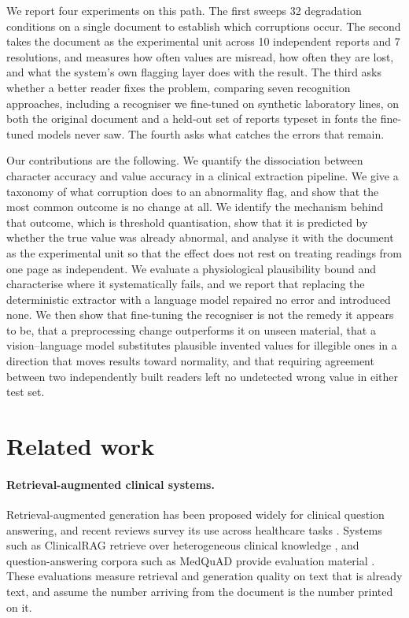 \documentclass[11pt]{article}
\begin{document}
We report four experiments on this path. The first sweeps 32 degradation conditions on a single
document to establish which corruptions occur. The second takes the document as the
experimental unit across 10 independent reports and 7 resolutions, and measures how often
values are misread, how often they are lost, and what the system's own flagging layer does with
the result. The third asks whether a better reader fixes the problem, comparing seven
recognition approaches, including a recogniser we fine-tuned on synthetic laboratory lines, on
both the original document and a held-out set of reports typeset in fonts the fine-tuned models
never saw. The fourth asks what catches the errors that remain.

Our contributions are the following. We quantify the dissociation between character accuracy
and value accuracy in a clinical extraction pipeline. We give a taxonomy of what corruption
does to an abnormality flag, and show that the most common outcome is no change at all. We
identify the mechanism behind that outcome, which is threshold quantisation, show that it is
predicted by whether the true value was already abnormal, and analyse it with the document as
the experimental unit so that the effect does not rest on treating readings from one page as
independent. We evaluate a physiological plausibility bound and characterise where it
systematically fails, and we report that replacing the deterministic extractor with a language
model repaired no error and introduced none. We then show that fine-tuning the recogniser is not
the remedy it appears to be, that a preprocessing change outperforms it on unseen material, that
a vision--language model substitutes plausible invented values for illegible ones in a direction
that moves results toward normality, and that requiring agreement between two independently
built readers left no undetected wrong value in either test set.

\section{Related work}

\paragraph{Retrieval-augmented clinical systems.}
Retrieval-augmented generation has been proposed widely for clinical question answering, and
recent reviews survey its use across healthcare tasks \citep{gao2023rag,amugongo2025rag}.
Systems such as ClinicalRAG retrieve over heterogeneous clinical knowledge
\citep{lu2024clinicalrag}, and question-answering corpora such as MedQuAD provide evaluation
material \citep{benabacha2019medquad}. These evaluations measure retrieval and generation
quality on text that is already text, and assume the number arriving from the document is the
number printed on it.
\end{document}
